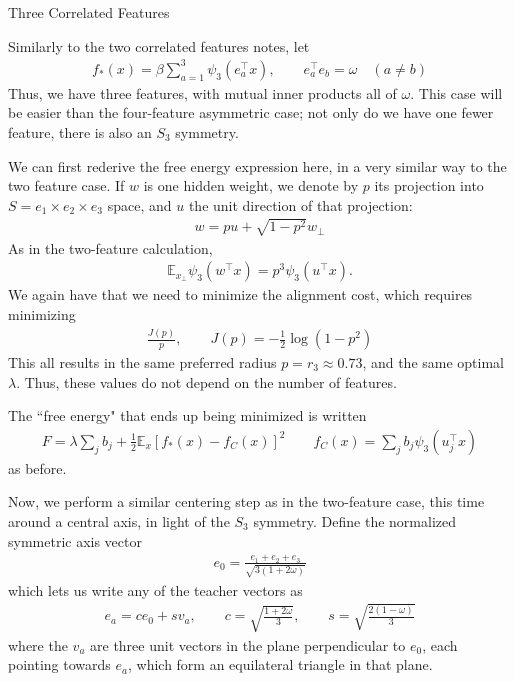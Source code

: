 \documentclass[11pt, reqno]{amsart}
\makeatletter
\def\section{\@startsection{section}{1}%
  \z@{.7\linespacing\@plus\linespacing}{.5\linespacing}%
  {\normalfont\scshape\centering}}
\theoremstyle{notestyle}
\theoremstyle{defstyle}
\makeatother
\begin{document}
\section{Three Correlated Features}

Similarly to the two correlated features notes, let
\begin{align*}
f_* (x) = \beta \sum_{a=1}^3 \psi_3(e_a^\top x),
\qquad e_a^\top e_b = \omega \quad (a \neq b)
\end{align*}
Thus, we have three features, with mutual inner products all of $\omega$.
This case will be easier than the four-feature asymmetric case; not only do we have one fewer feature, there is also an $S_3$ symmetry.

We can first rederive the free energy expression here, in a very similar way to the two feature case.
If $w$ is one hidden weight, we denote by $p$ its projection into $S = e_1 \times e_2 \times e_3$ space, and $u$ the unit direction of that projection:
\begin{align*}
w = pu + \sqrt{1-p^2} w_\perp
\end{align*}
As in the two-feature calculation,
\begin{align*}
\mathbb{E}_{x_\perp} \psi_3(w^\top x)
= p^3 \psi_3 (u^\top x).
\end{align*}
We again have that we need to minimize the alignment cost, which requires minimizing
\begin{align*}
\frac{J(p)}{p},
\qquad J(p) = -\frac{1}{2} \log (1-p^2)
\end{align*}
This all results in the same preferred radius $p = r_3 \approx 0.73$, and the same optimal $\lambda$.
Thus, these values do not depend on the number of features.

The ``free energy" that ends up being minimized is written
\begin{align*}
F = \lambda \sum_{j} b_j + \frac{1}{2} \mathbb{E}_x [f_*(x) - f_C(x)]^2
\qquad f_C(x) = \sum_j b_j \psi_3(u_j^\top x)
\end{align*}
as before.

Now, we perform a similar centering step as in the two-feature case, this time around a central axis, in light of the $S_3$ symmetry.
Define the normalized symmetric axis vector
\begin{align*}
e_0 = \frac{e_1 + e_2 + e_3}{\sqrt{3(1+2\omega)}}
\end{align*}
which lets us write any of the teacher vectors as
\begin{align*}
    e_a = c e_0 + s v_a,
    \qquad c = \sqrt{\frac{1+2\omega}{3}},
    \qquad s = \sqrt{\frac{2(1-\omega)}{3}}
\end{align*}
where the $v_a$ are three unit vectors in the plane perpendicular to $e_0$, each pointing towards $e_a$, which form an equilateral triangle in that plane.
\end{document}

